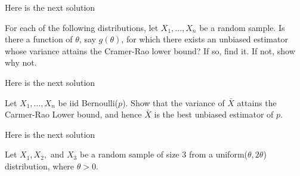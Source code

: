 \documentclass[12pt,letterpaper]{exam}
\begin{document}
\begin{questions}

	\begin{solution}
		Here is the next solution
	\end{solution}

\renewcommand{\thequestion}{38}
\question For each of the following distributions, let $X_1,...,X_n$ be a random sample. Is there a function of $\theta$, say $g(\theta)$, for which there exists an unbiased estimator whose variance attains the Cramer-Rao lower bound? If so, find it. If not, show why not.
	\begin{solution}
		Here is the next solution
	\end{solution}

\renewcommand{\thequestion}{40}
\question Let $X_1,...,X_n$ be iid Bernoulli($p$). Show that the variance of $\bar{X}$ attains the Carmer-Rao Lower bound, and hence $\bar{X}$ is the best unbiased estimator of $p$.
	\begin{solution}
		Here is the next solution
	\end{solution}

\renewcommand{\thequestion}{46}
\question Let $X_1, X_2,$ and $X_3$ be a random sample of size 3 from a uniform($\theta, 2\theta$) distribution, where $\theta >0$.
\begin{parts}

\end{parts}
\end{questions}
\end{document}
